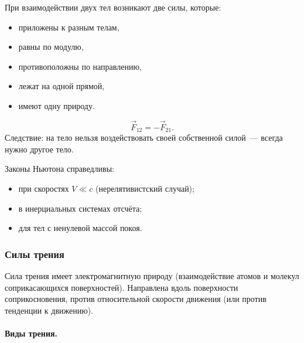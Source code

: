 \documentclass[12pt]{article}
\begin{document}
\begin{definition}
	При взаимодействии двух тел возникают две силы, которые:
	\begin{itemize}
		\item приложены к разным телам,
		\item равны по модулю,
		\item противоположны по направлению,
		\item лежат на одной прямой,
		\item имеют одну природу.
	\end{itemize}
	\[
		\vec{F}_{12} = -\vec{F}_{21}.
	\]
	Следствие: на тело нельзя воздействовать своей собственной силой~--- всегда нужно другое тело.
\end{definition}

\begin{statement}
	Законы Ньютона справедливы:
	\begin{itemize}
		\item при скоростях $V \ll c$ (нерелятивистский случай);
		\item в инерциальных системах отсчёта;
		\item для тел с ненулевой массой покоя.
	\end{itemize}
\end{statement}

\subsubsection{Силы трения}

\begin{definition}
	Сила трения имеет электромагнитную природу (взаимодействие атомов и молекул соприкасающихся поверхностей). Направлена вдоль поверхности соприкосновения, против относительной скорости движения (или против тенденции к движению).
\end{definition}

\paragraph{Виды трения.}
\end{document}
